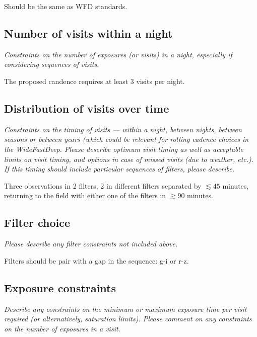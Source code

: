 \documentclass[11pt]{article}
\begin{document}
Should be the same as WFD standards.

\subsection{Number of visits within a night}
\begin{footnotesize}{\it Constraints on the number of exposures (or visits) in a night, especially if considering sequences of visits.  }
\end{footnotesize}

The proposed candence requires at least 3 visits per night.

\subsection{Distribution of visits over time}
\begin{footnotesize}{\it Constraints on the timing of visits --- within a night, between nights, between seasons or between years (which could be relevant for rolling cadence choices in the WideFastDeep. Please describe optimum visit timing as well as acceptable limits on visit timing, and options in case of missed visits (due to weather, etc.). If this timing should include particular sequences of filters, please describe.}
\end{footnotesize}

Three  observations in 2 filters, 2 in different filters separated by $\lesssim45$ minutes, returning to the field with either one of the filters in $\gtrsim90$ minutes.



\subsection{Filter choice}
\begin{footnotesize}
{\it Please describe any filter constraints not included above.}
\end{footnotesize}

Filters should be pair with a gap in the sequence: g-i or r-z.                                                       
\subsection{Exposure constraints}
\begin{footnotesize}
{\it Describe any constraints on the minimum or maximum exposure time per visit required (or alternatively, saturation limits). Please comment on any constraints on the number of exposures in a visit.}
\end{footnotesize}
\end{document}
